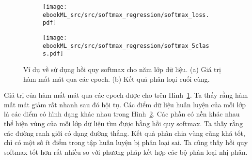 \begin{figure}[t]
\begin{subfigure}{0.49\textwidth}
\texttt{[image: ebookML\_src/src/softmax\_regression/softmax\_loss.pdf]}
\caption{}
\label{fig:13_exa}
\end{subfigure}
\begin{subfigure}{0.49\textwidth}
\texttt{[image: ebookML\_src/src/softmax\_regression/softmax\_5class.pdf]}
\caption{}
\label{fig:13_exb}
\end{subfigure}
\caption{
Ví dụ về sử dụng hồi quy softmax cho năm lớp dữ liệu. (a) Giá trị hàm mất mát qua các
epoch. (b) Kết quả phân loại cuối cùng.
}
\label{fig:13_ex}
\end{figure}
Giá trị của hàm mất mát qua các epoch được cho trên Hình~\ref{fig:13_exa}. Ta
thấy rằng hàm mất mát giảm rất nhanh sau đó hội tụ. Các điểm dữ liệu huấn luyện
của mỗi lớp là các điểm có hình dạng khác nhau trong Hình~\ref{fig:13_exb}. Các
phần có nền khác nhau thể hiện vùng của mỗi lớp dữ liệu tìm được bằng hồi quy
softmax. Ta thấy rằng các đường ranh giới có dạng đường thẳng. Kết quả phân chia
vùng cũng khá tốt, chỉ có một số ít điểm trong tập huấn luyện bị phân loại sai.
Ta cũng thấy hồi quy softmax tốt hơn rất nhiều so với phương pháp kết hợp các bộ
phân loại nhị phân.










